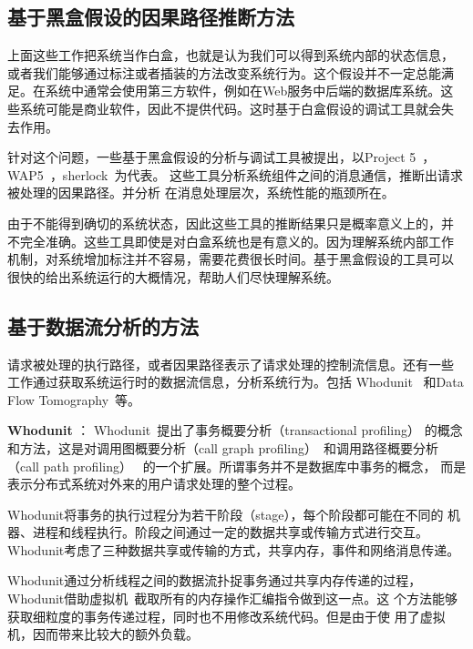 \subsection{基于黑盒假设的因果路径推断方法}
\label{related:debug:inference}

上面这些工作把系统当作白盒，也就是认为我们可以得到系统内部的状态信息，
或者我们能够通过标注或者插装的方法改变系统行为。这个假设并不一定总能满
足。在系统中通常会使用第三方软件，例如在Web服务中后端的数据库系统。这
些系统可能是商业软件，因此不提供代码。这时基于白盒假设的调试工具就会失
去作用。

针对这个问题，一些基于黑盒假设的分析与调试工具被提出，以Project
5~\cite{project5}，WAP5~\cite{wap5}，sherlock~\cite{sherlock}为代表。
这些工具分析系统组件之间的消息通信，推断出请求被处理的因果路径。并分析
在消息处理层次，系统性能的瓶颈所在。

由于不能得到确切的系统状态，因此这些工具的推断结果只是概率意义上的，并
不完全准确。这些工具即使是对白盒系统也是有意义的。因为理解系统内部工作
机制，对系统增加标注并不容易，需要花费很长时间。基于黑盒假设的工具可以
很快的给出系统运行的大概情况，帮助人们尽快理解系统。

\subsection{基于数据流分析的方法}
\label{related:debug:dataflow}

请求被处理的执行路径，或者因果路径表示了请求处理的控制流信息。还有一些
工作通过获取系统运行时的数据流信息，分析系统行为。包括
Whodunit~\cite{whodunit} 和Data Flow Tomography~\cite{dft}等。

\textbf{Whodunit} ：
Whodunit~\cite{whodunit}提出了事务概要分析（transactional profiling）
的概念和方法，这是对调用图概要分析（call graph
profiling）~\cite{Graham2004}和调用路径概要分析（call path profiling）~
\cite{Hall1992, Hall1993}的一个扩展。所谓事务并不是数据库中事务的概念，
而是表示分布式系统对外来的用户请求处理的整个过程。

Whodunit将事务的执行过程分为若干阶段（stage），每个阶段都可能在不同的
机器、进程和线程执行。阶段之间通过一定的数据共享或传输方式进行交互。
Whodunit考虑了三种数据共享或传输的方式，共享内存，事件和网络消息传递。

Whodunit通过分析线程之间的数据流扑捉事务通过共享内存传递的过程，
Whodunit借助虚拟机~\cite{qemu}截取所有的内存操作汇编指令做到这一点。这
个方法能够获取细粒度的事务传递过程，同时也不用修改系统代码。但是由于使
用了虚拟机，因而带来比较大的额外负载。

